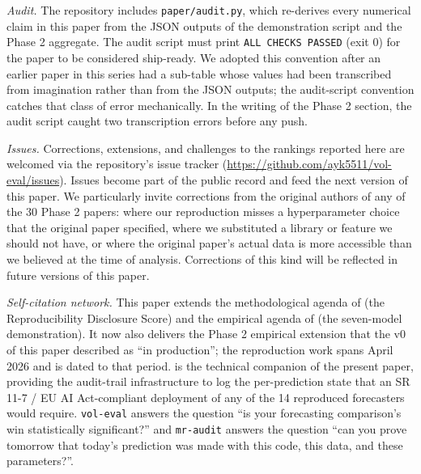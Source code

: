 \textit{Audit.} The repository includes \texttt{paper/audit.py}, which re-derives every numerical claim in this paper from the JSON outputs of the demonstration script and the Phase 2 aggregate. The audit script must print \texttt{ALL CHECKS PASSED} (exit 0) for the paper to be considered ship-ready. We adopted this convention after an earlier paper in this series \citep{KhanVol2026} had a sub-table whose values had been transcribed from imagination rather than from the JSON outputs; the audit-script convention catches that class of error mechanically. In the writing of the Phase 2 section, the audit script caught two transcription errors before any push.

\textit{Issues.} Corrections, extensions, and challenges to the rankings reported here are welcomed via the repository's issue tracker (\url{https://github.com/ayk5511/vol-eval/issues}). Issues become part of the public record and feed the next version of this paper. We particularly invite corrections from the original authors of any of the 30 Phase 2 papers: where our reproduction misses a hyperparameter choice that the original paper specified, where we substituted a library or feature we should not have, or where the original paper's actual data is more accessible than we believed at the time of analysis. Corrections of this kind will be reflected in future versions of this paper.

\textit{Self-citation network.} This paper extends the methodological agenda of \citet{Khan2026Survey} (the Reproducibility Disclosure Score) and the empirical agenda of \citet{KhanVol2026} (the seven-model demonstration). It now also delivers the Phase 2 empirical extension that the v0 of this paper described as ``in production''; the reproduction work spans April 2026 and is dated to that period. \citet{Khan2026MrAudit} is the technical companion of the present paper, providing the audit-trail infrastructure to log the per-prediction state that an SR 11-7 / EU AI Act-compliant deployment of any of the 14 reproduced forecasters would require. \texttt{vol-eval} answers the question ``is your forecasting comparison's win statistically significant?'' and \texttt{mr-audit} answers the question ``can you prove tomorrow that today's prediction was made with this code, this data, and these parameters?''.
